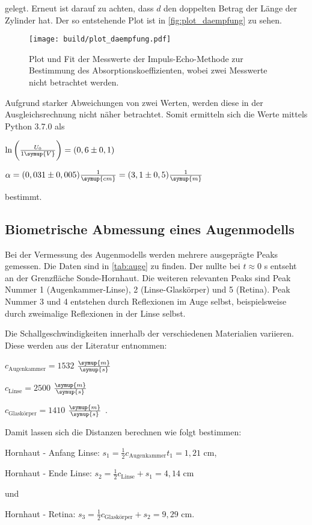 gelegt. Erneut ist darauf zu achten, dass $d$ den doppelten Betrag der Länge der Zylinder hat.
Der so entstehende Plot ist in \autoref{fig:plot_daempfung} zu sehen.

\begin{figure}
    \centering
    \texttt{[image: build/plot\_daempfung.pdf]}
    \caption{Plot und Fit der Messwerte der Impuls-Echo-Methode zur Bestimmung des Absorptionskoeffizienten, wobei zwei Messwerte nicht betrachtet werden.}
    \label{fig:plot_daempfung}
\end{figure}

Aufgrund starker Abweichungen von zwei Werten, werden diese in der Ausgleichsrechnung nicht näher betrachtet.
Somit ermitteln sich die Werte mittels Python 3.7.0 als

\begin{center}
    $\ln \bigg( \frac{U_0}{1\symup{V}} \bigg) = (0,6 \pm 0,1)$

    $\alpha = (0,031 \pm 0,005) \frac{1}{\symup{cm}} = (3,1 \pm 0,5) \frac{1}{\symup{m}}$
\end{center}

bestimmt.

\subsection{Biometrische Abmessung eines Augenmodells}

Bei der Vermessung des Augenmodells werden mehrere ausgeprägte Peaks gemessen. Die Daten sind in \autoref{tab:auge} zu finden.
Der nullte bei $t \approx 0$ s entseht an der Grenzfläche Sonde-Hornhaut. Die weiteren relevanten Peaks sind Peak Nummer 1 (Augenkammer-Linse), 2 (Linse-Glaskörper) und 5 (Retina).
Peak Nummer 3 und 4 entstehen durch Reflexionen im Auge selbst, beispielsweise durch zweimalige Reflexionen in der Linse selbst.



Die Schallgeschwindigkeiten innerhalb der verschiedenen Materialien variieren. Diese werden aus der Literatur entnommen:

\begin{center}
    $c_\text{Augenkammer} = 1532$ $\frac{\symup{m}}{\symup{s}}$\cite[63]{augeZahlen}

    $c_\text{Linse} = 2500$ $\frac{\symup{m}}{\symup{s}}$ \cite{US1}

    $c_\text{Glaskörper} = 1410$ $\frac{\symup{m}}{\symup{s}}$ \cite{US1}.
\end{center}

Damit lassen sich die Distanzen berechnen wie folgt bestimmen:

\begin{center}
    Hornhaut - Anfang Linse: $s_1 = \frac{1}{2} c_\text{Augenkammer} t_1 = 1,21$ cm,

    Hornhaut - Ende Linse: $s_2 = \frac{1}{2} c_\text{Linse} + s_1 = 4,14$ cm

    und

    Hornhaut - Retina: $s_3 = \frac{1}{2} c_\text{Glaskörper} + s_2 = 9,29$ cm.
\end{center}
